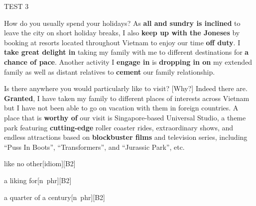 \begin{glossarymc}[Cambridge 4]
\begin{test}{TEST 3}
	\begin{qa}{How do you usually spend your holidays?}
	As \textbf{all and sundry is inclined} to leave the city on short holiday breaks, I also \textbf{keep up with the Joneses} by booking at resorts located throughout Vietnam to enjoy our time \textbf{off duty}. I \textbf{take great delight in} taking my family with me to different destinations for \textbf{a chance of pace}. Another activity I \textbf{engage in} is \textbf{dropping in on} my extended family as well as distant relatives to \textbf{cement} our family relationship.
	\end{qa}

	\begin{qa}{Is there anywhere you would particularly like to visit? [Why?]}
	Indeed there are. \textbf{Granted}, I have taken my family to different places of interests across Vietnam but I have not been able to go on vacation with them in foreign countries. A place that is \textbf{worthy of} our visit is Singapore-based Universal Studio, a theme park featuring \textbf{cutting-edge} roller coaster rides, extraordinary shows, and endless attractions based on \textbf{blockbuster films} and television series, including “Puss In Boots”, “Transformers”, and “Jurassic Park”, etc.
	\end{qa}

        \begin{VocabExplain}[Part 1]
			\begin{ExplainCard}{like no other}[idiom][B2]
			\end{ExplainCard}

			\begin{ExplainCard}{a liking for}[n~phr][B2]
			\end{ExplainCard}

			\begin{ExplainCard}{a quarter of a century}[n~phr][B2]
			\end{ExplainCard}


\end{VocabExplain}
\end{test}
\end{glossarymc}

